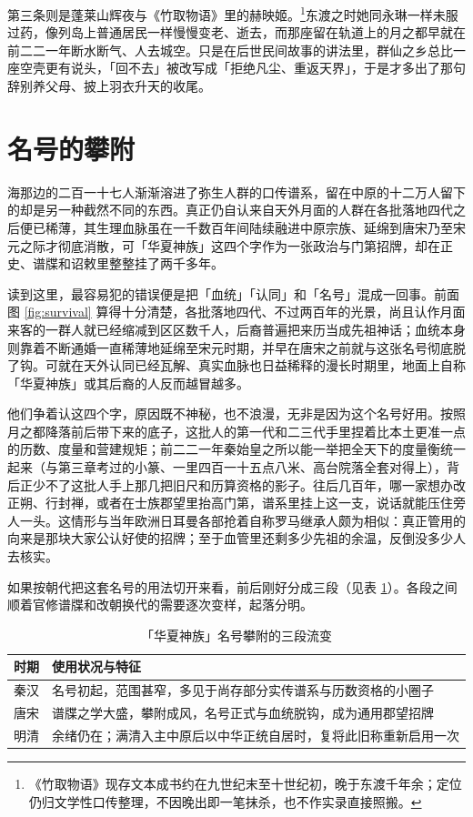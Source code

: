 第三条则是蓬莱山辉夜与《竹取物语》里的赫映姬。\footnote{《竹取物语》现存文本成书约在九世纪末至十世纪初，晚于东渡千年余；定位仍归文学性口传整理，不因晚出即一笔抹杀，也不作实录直接照搬。}东渡之时她同永琳一样未服过药，像列岛上普通居民一样慢慢变老、逝去，而那座留在轨道上的月之都早就在前二二一年断水断气、人去城空。只是在后世民间故事的讲法里，群仙之乡总比一座空壳更有说头，「回不去」被改写成「拒绝凡尘、重返天界」，于是才多出了那句辞别养父母、披上羽衣升天的收尾。

\section{名号的攀附}

海那边的二百一十七人渐渐溶进了弥生人群的口传谱系，留在中原的十二万人留下的却是另一种截然不同的东西。真正仍自认来自天外月面的人群在各批落地四代之后便已稀薄，其生理血脉虽在一千数百年间陆续融进中原宗族、延绵到唐宋乃至宋元之际才彻底消散，可「华夏神族」这四个字作为一张政治与门第招牌，却在正史、谱牒和诏敕里整整挂了两千多年。

读到这里，最容易犯的错误便是把「血统」「认同」和「名号」混成一回事。前面图 \ref{fig:survival} 算得十分清楚，各批落地四代、不过两百年的光景，尚且认作月面来客的一群人就已经缩减到区区数千人，后裔普遍把来历当成先祖神话；血统本身则靠着不断通婚一直稀薄地延绵至宋元时期，并早在唐宋之前就与这张名号彻底脱了钩。可就在天外认同已经瓦解、真实血脉也日益稀释的漫长时期里，地面上自称「华夏神族」或其后裔的人反而越冒越多。

他们争着认这四个字，原因既不神秘，也不浪漫，无非是因为这个名号好用。按照月之都降落前后带下来的底子，这批人的第一代和二三代手里捏着比本土更准一点的历数、度量和营建规矩；前二二一年秦始皇之所以能一举把全天下的度量衡统一起来（与第三章考过的小篆、一里四百一十五点八米、高台院落全套对得上），背后正少不了这批人手上那几把旧尺和历算资格的影子。往后几百年，哪一家想办改正朔、行封禅，或者在士族郡望里抬高门第，谱系里挂上这一支，说话就能压住旁人一头。这情形与当年欧洲日耳曼各部抢着自称罗马继承人颇为相似：真正管用的向来是那块大家公认好使的招牌；至于血管里还剩多少先祖的余温，反倒没多少人去核实。

如果按朝代把这套名号的用法切开来看，前后刚好分成三段（见表 \ref{tab:lineage}）。各段之间顺着官修谱牒和改朝换代的需要逐次变样，起落分明。

\begin{table}[htbp]
  \centering
  \caption{「华夏神族」名号攀附的三段流变}
  \label{tab:lineage}
  \footnotesize
  \begin{tabular}{@{}p{18mm}p{104mm}@{}}
    \toprule
    时期 & 使用状况与特征 \\
    \midrule
    秦汉 & 名号初起，范围甚窄，多见于尚存部分实传谱系与历数资格的小圈子 \\
    唐宋 & 谱牒之学大盛，攀附成风，名号正式与血统脱钩，成为通用郡望招牌 \\
    明清 & 余绪仍在；满清入主中原后以中华正统自居时，复将此旧称重新启用一次 \\
    \bottomrule
  \end{tabular}
\end{table}

